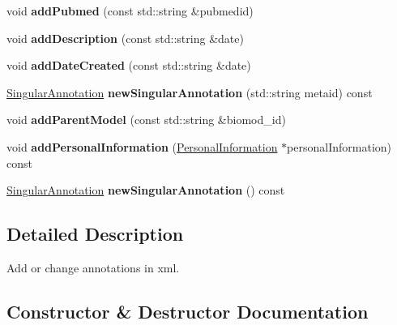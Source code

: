 \begin{DoxyCompactItemize}
void {\bfseries add\+Pubmed} (const std\+::string \&pubmedid)
\item 
\mbox{\label{classomexmeta_1_1Editor_a8526a87544b1265695f1749100da5fa2}} 
void {\bfseries add\+Description} (const std\+::string \&date)
\item 
\mbox{\label{classomexmeta_1_1Editor_ae1b146f142ec10237f8edbecf0368f8e}} 
void {\bfseries add\+Date\+Created} (const std\+::string \&date)
\item 
\mbox{\label{classomexmeta_1_1Editor_a50674b2591d2fed572954ac8490ee21c}} 
\hyperlink{classomexmeta_1_1Triple}{Singular\+Annotation} {\bfseries new\+Singular\+Annotation} (std\+::string metaid) const
\item 
\mbox{\label{classomexmeta_1_1Editor_ad7240613a1f3e215af6e4a05d121508c}} 
void {\bfseries add\+Parent\+Model} (const std\+::string \&biomod\+\_\+id)
\item 
\mbox{\label{classomexmeta_1_1Editor_ae97ebb9bb2bc3ebd7d3b0a5eca9dfb0f}} 
void {\bfseries add\+Personal\+Information} (\hyperlink{classomexmeta_1_1PersonalInformation}{Personal\+Information} $\ast$personal\+Information) const
\item 
\mbox{\label{classomexmeta_1_1Editor_a6142da2b89068e9638410c3c903e3b64}} 
\hyperlink{classomexmeta_1_1Triple}{Singular\+Annotation} {\bfseries new\+Singular\+Annotation} () const
\end{DoxyCompactItemize}


\subsection{Detailed Description}
Add or change annotations in xml. 

\subsection{Constructor \& Destructor Documentation}
\mbox{\label{classomexmeta_1_1Editor_a6ac976c1a3762f77a577b5735cd509f4}} 
